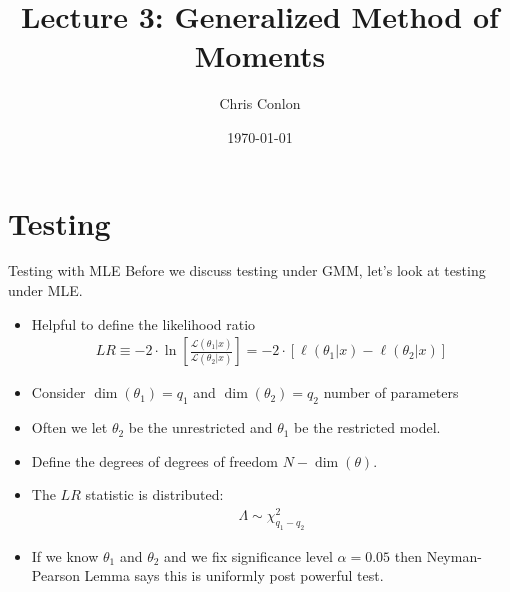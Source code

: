 


\title{Lecture 3: Generalized Method of Moments}
\author{Chris Conlon }

\date{\today}


\maketitle



\section{Testing}

\begin{frame}{Testing with MLE}
Before we discuss testing under GMM, let's look at testing under MLE.
\begin{itemize}
\item Helpful to define the \alert{likelihood ratio}
\begin{align*}
LR \equiv -2 \cdot \ln \left[ \frac{\mathcal{L}(\theta_1 | x)}{\mathcal{L}(\theta_2 | x)}  \right]= -2 \cdot \left[ \ell(\theta_1 | x) - \ell(\theta_2 | x) \right]
\end{align*}
\item Consider $\dim(\theta_1) = q_1$ and $\dim(\theta_2) = q_2$ \alert{number of parameters}
\item Often we let $\theta_2$ be the \alert{unrestricted} and $\theta_1$ be the \alert{restricted} model.
\item Define the degrees of \alert{degrees of freedom} $N - \dim(\theta)$.
\item The $LR$ statistic is distributed:
\begin{align*}
 \Lambda \sim \chi^2_{q_1-q_2}
\end{align*}
\item If we know $\theta_1$ and $\theta_2$ and we fix significance level $\alpha =0.05$ then \alert{Neyman-Pearson Lemma} says this is \alert{uniformly post powerful test}.
\end{itemize}
\end{frame}

